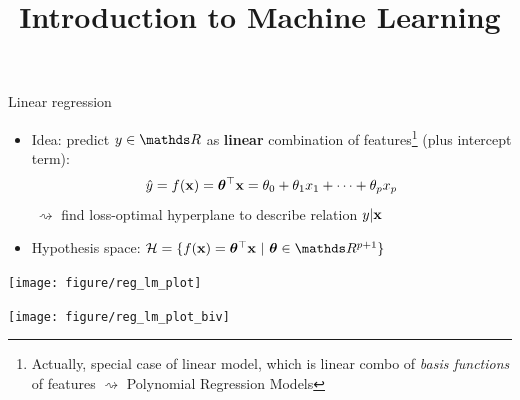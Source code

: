 \documentclass[11pt,compress,t,notes=noshow, xcolor=table]{beamer}
\title{Introduction to Machine Learning}
\institute{\href{https://compstat-lmu.github.io/lecture_i2ml/}{compstat-lmu.github.io/lecture\_i2ml}}
\date{}
\begin{document}

\begin{frame}{Linear regression}

\begin{itemize}
    \item Idea: predict $y \in \R$ as \textbf{linear} combination of 
    features\footnote[frame]{\tiny
    Actually, special case of linear model, which is linear combo of 
    \textit{basis functions} of features $\rightsquigarrow$
    Polynomial Regression Models
    }
    (plus intercept term):
    $$\hat{y} = f(\mathbf{x}) = \bm{\theta}^\top \mathbf{x} = \theta_0 + \theta_1 x_1 + \dots + \theta_p x_p$$
    $~\rightsquigarrow$ find loss-optimal hyperplane to describe relation 
    $y | \mathbf{x}$
    \item Hypothesis space: $\Hspace = \{\fx = \thx\ |\ \thetab \in \R^{p+1} \}$
    
\end{itemize}
\vfill
\begin{minipage}{0.4\textwidth}
    \texttt{[image: figure/reg\_lm\_plot]} 
\end{minipage}
\hspace{1cm}
\begin{minipage}{0.4\textwidth}
    \texttt{[image: 
    figure/reg\_lm\_plot\_biv]} 
\end{minipage}

\end{frame} 

\end{document}
